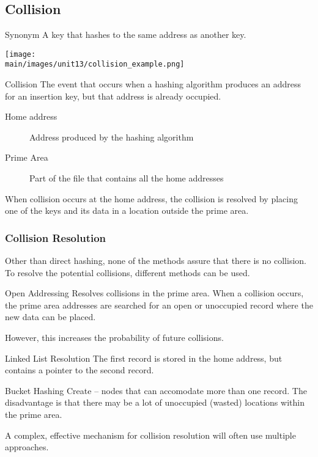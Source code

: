 \documentclass[\main/notes.tex]{subfiles}
\begin{document}
			\subsection{Collision}
				\begin{definition}{Synonym}
					A key that hashes to the same address as another key.
				\end{definition}
				\begin{center}
					\texttt{[image: \\main/images/unit13/collision\_example.png]}
				\end{center}
				\begin{definition}{Collision}
					The event that occurs when a hashing algorithm produces an address for an insertion key, but that address is already occupied.
					\begin{indentparagraph}
						\begin{description}
							\item[Home address] Address produced by the hashing algorithm
							\item[Prime Area] Part of the file that contains all the home addresses 
						\end{description}
					\end{indentparagraph}
					When collision occurs at the home address, the collision is resolved by placing one of the keys and its data in a location outside the prime area.
				\end{definition}
				\subsubsection{Collision Resolution}
					Other than direct hashing, none of the methods assure that there is no collision. To resolve the potential collisions, different methods can be used.
					\begin{definition}{Open Addressing}
						Resolves collisions in the prime area. When a collision occurs, the prime area addresses are searched for an open or unoccupied record where the new data can be placed.

						However, this increases the probability of future collisions.
					\end{definition}
					\begin{definition}{Linked List Resolution}
						The first record is stored in the home address, but contains a pointer to the second record.
					\end{definition}
					\begin{definition}{Bucket Hashing}
						Create  -- nodes that can accomodate more than one record. The disadvantage is that there may be a lot of unoccupied (wasted) locations within the prime area.
					\end{definition}
					A complex, effective mechanism for collision resolution will often use multiple approaches.
\end{document}

